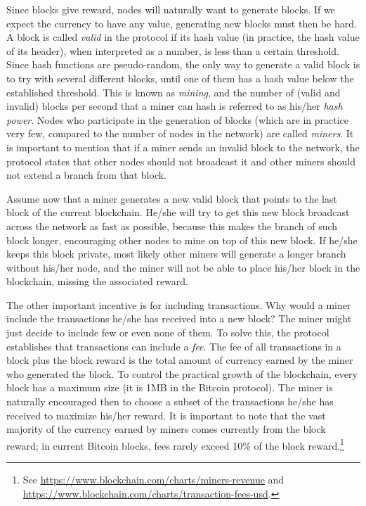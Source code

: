 Since blocks give reward, nodes will naturally want to generate blocks. If we expect the currency to have any value, generating new blocks must then be hard. A block is called \emph{valid} in the protocol if its hash value (in practice, the hash value of its header), when interpreted as a number, is less than a certain threshold. Since hash functions are pseudo-random, the only way to generate a valid block is to try with several different blocks, until one of them has a hash value below the established threshold. This is known as \emph{mining}, and the number of (valid and invalid) blocks per second that a miner can hash is referred to as his/her \emph{hash power}. Nodes who participate in the generation of blocks (which are in practice very few, compared to the number of nodes in the network) are called \emph{miners}. It is important to mention that if a miner sends an invalid block to the network, the protocol states that other nodes should not broadcast it and other miners should not extend a branch from that block. 

Assume now that a miner generates a new valid block that points to the last block of the current blockchain. He/she will try to get this new block broadcast across the network as fast as possible, because this makes the branch of such block longer, encouraging other nodes to mine on top of this new block. If he/she keeps this block private, most likely other miners will generate a longer branch without his/her node, and the miner will not be able to place his/her block in the blockchain, missing the associated reward.

The other important incentive is for including transactions. Why would a miner include the transactions he/she has received into a new block? The miner might just decide to include few or even none of them. To solve this, the protocol establishes that transactions can include a \emph{fee}. The fee of all transactions in a block plus the block reward is the total amount of currency earned by the miner who generated the block. To control the practical growth of the blockchain, every block has a maximum size (it is 1MB in the Bitcoin protocol). The miner is naturally encouraged then to choose a subset of the transactions he/she has received to maximize his/her reward. It is important to note that the vast majority of the currency earned by miners comes currently from the block reward; in current Bitcoin blocks, fees rarely exceed 10\% of the block reward.\footnote{See  \url{https://www.blockchain.com/charts/miners-revenue} and \url{https://www.blockchain.com/charts/transaction-fees-usd}.}


